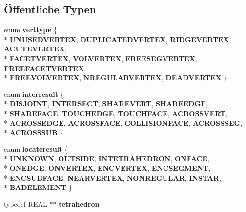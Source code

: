 \subsection*{Öffentliche Typen}
\begin{DoxyCompactItemize}
\item 
enum {\bfseries verttype} \{ \\*
{\bfseries U\-N\-U\-S\-E\-D\-V\-E\-R\-T\-E\-X}, 
{\bfseries D\-U\-P\-L\-I\-C\-A\-T\-E\-D\-V\-E\-R\-T\-E\-X}, 
{\bfseries R\-I\-D\-G\-E\-V\-E\-R\-T\-E\-X}, 
{\bfseries A\-C\-U\-T\-E\-V\-E\-R\-T\-E\-X}, 
\\*
{\bfseries F\-A\-C\-E\-T\-V\-E\-R\-T\-E\-X}, 
{\bfseries V\-O\-L\-V\-E\-R\-T\-E\-X}, 
{\bfseries F\-R\-E\-E\-S\-E\-G\-V\-E\-R\-T\-E\-X}, 
{\bfseries F\-R\-E\-E\-F\-A\-C\-E\-T\-V\-E\-R\-T\-E\-X}, 
\\*
{\bfseries F\-R\-E\-E\-V\-O\-L\-V\-E\-R\-T\-E\-X}, 
{\bfseries N\-R\-E\-G\-U\-L\-A\-R\-V\-E\-R\-T\-E\-X}, 
{\bfseries D\-E\-A\-D\-V\-E\-R\-T\-E\-X}
 \}
\item 
enum {\bfseries interresult} \{ \\*
{\bfseries D\-I\-S\-J\-O\-I\-N\-T}, 
{\bfseries I\-N\-T\-E\-R\-S\-E\-C\-T}, 
{\bfseries S\-H\-A\-R\-E\-V\-E\-R\-T}, 
{\bfseries S\-H\-A\-R\-E\-E\-D\-G\-E}, 
\\*
{\bfseries S\-H\-A\-R\-E\-F\-A\-C\-E}, 
{\bfseries T\-O\-U\-C\-H\-E\-D\-G\-E}, 
{\bfseries T\-O\-U\-C\-H\-F\-A\-C\-E}, 
{\bfseries A\-C\-R\-O\-S\-S\-V\-E\-R\-T}, 
\\*
{\bfseries A\-C\-R\-O\-S\-S\-E\-D\-G\-E}, 
{\bfseries A\-C\-R\-O\-S\-S\-F\-A\-C\-E}, 
{\bfseries C\-O\-L\-L\-I\-S\-I\-O\-N\-F\-A\-C\-E}, 
{\bfseries A\-C\-R\-O\-S\-S\-S\-E\-G}, 
\\*
{\bfseries A\-C\-R\-O\-S\-S\-S\-U\-B}
 \}
\item 
enum {\bfseries locateresult} \{ \\*
{\bfseries U\-N\-K\-N\-O\-W\-N}, 
{\bfseries O\-U\-T\-S\-I\-D\-E}, 
{\bfseries I\-N\-T\-E\-T\-R\-A\-H\-E\-D\-R\-O\-N}, 
{\bfseries O\-N\-F\-A\-C\-E}, 
\\*
{\bfseries O\-N\-E\-D\-G\-E}, 
{\bfseries O\-N\-V\-E\-R\-T\-E\-X}, 
{\bfseries E\-N\-C\-V\-E\-R\-T\-E\-X}, 
{\bfseries E\-N\-C\-S\-E\-G\-M\-E\-N\-T}, 
\\*
{\bfseries E\-N\-C\-S\-U\-B\-F\-A\-C\-E}, 
{\bfseries N\-E\-A\-R\-V\-E\-R\-T\-E\-X}, 
{\bfseries N\-O\-N\-R\-E\-G\-U\-L\-A\-R}, 
{\bfseries I\-N\-S\-T\-A\-R}, 
\\*
{\bfseries B\-A\-D\-E\-L\-E\-M\-E\-N\-T}
 \}
\item 
\hypertarget{classtetgenmesh_a6a12b1c0d1834ca941d16c62e949e5e3}{typedef R\-E\-A\-L $\ast$$\ast$ {\bfseries tetrahedron}}\label{classtetgenmesh_a6a12b1c0d1834ca941d16c62e949e5e3}


\end{DoxyCompactItemize}
